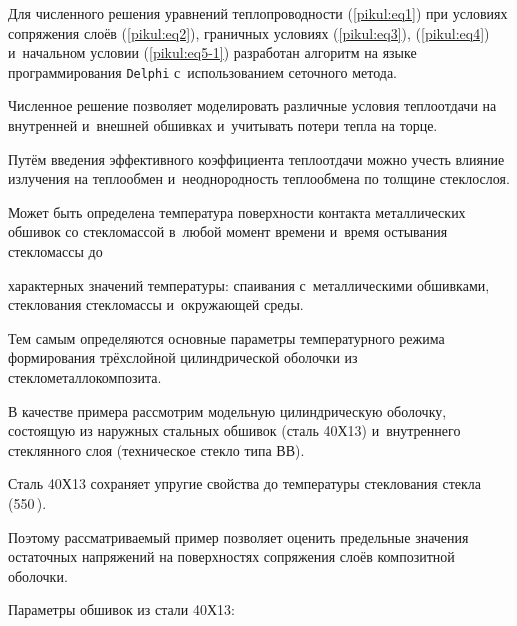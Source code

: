 Для численного решения уравнений теплопроводности (\ref{pikul:eq1}) при условиях сопряжения слоёв (\ref{pikul:eq2}), граничных условиях (\ref{pikul:eq3}), (\ref{pikul:eq4}) и~начальном условии (\ref{pikul:eq5-1}) разработан алгоритм на языке программирования {\tt Delphi} с~использованием сеточного метода.



Численное решение позволяет моделировать различные условия теплоотдачи на внутренней и~внешней обшивках и~учитывать потери тепла на торце. 

Путём введения эффективного коэффициента теплоотдачи можно учесть влияние излучения на теплообмен и~неоднородность теплообмена по толщине стеклослоя. 

Может быть определена температура поверхности контакта металлических обшивок со стекломассой в~любой момент времени и~время остывания стекломассы до 

характерных значений температуры: спаивания с~металлическими обшивками, стеклования стекломассы и~окружающей среды. 

Тем самым определяются основные параметры температурного режима формирования трёхслойной цилиндрической оболочки из стекло\-металлокомпозита.



\smallskip




В качестве  примера рассмотрим модельную цилиндрическую оболочку, состоящую из  наружных стальных обшивок (сталь 40Х13) и~внутреннего стеклянного слоя (техническое стекло типа ВВ).


Сталь 40Х13 сохраняет упругие свойства до температуры стеклования стекла (550\,\textcelsius). 

Поэтому рассматриваемый пример позволяет оценить предельные значения остаточных напряжений на поверхностях сопряжения слоёв композитной оболочки.



Параметры обшивок из стали 40Х13:

